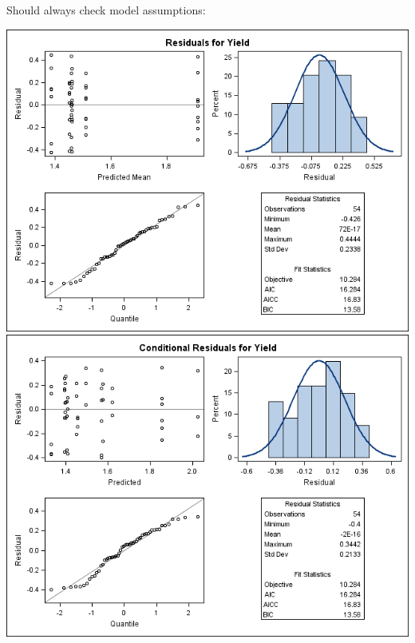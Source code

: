 Should always check model assumptions:
\begin{center}
		\includegraphics[scale=0.4]{ResidualPanel.png}\includegraphics[scale=0.4]{ResidualPanel1.png}
\end{center}


